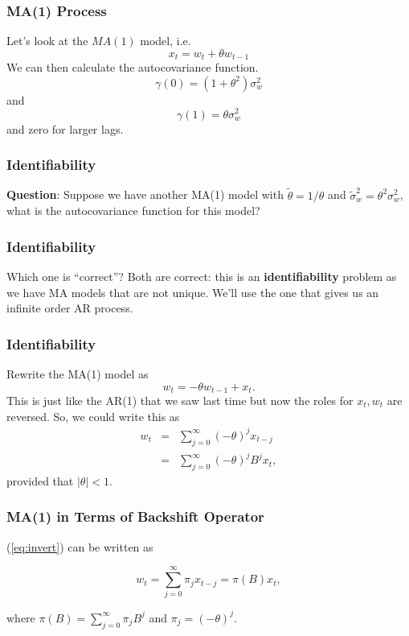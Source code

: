 \documentclass[%
xcolor=pdftex]{beamer}
\begin{document}
\begin{frame}
\frametitle{MA(1) Process}

Let's look at the $MA(1)$ model, i.e.
 $$
 x_t=w_t+ \theta w_{t-1}
 $$
 We can then calculate the autocovariance function.
 $$
 \gamma(0)=(1+\theta^2) \sigma_w^2
 $$
 and
 $$
 \gamma(1)=\theta \sigma_w^2
 $$
 and zero for larger lags.
 

\end{frame}

\begin{frame}
\frametitle{Identifiability}

\textbf{Question}: Suppose we have another MA(1) model with $\tilde{\theta}=1/\theta$ and $\tilde{\sigma}_w^2=\theta^2 \sigma^2_w$, what is the autocovariance function for this model?

\vspace{40mm}
\end{frame}

\begin{frame}
\frametitle{Identifiability}

 Which one is ``correct''?  Both are correct: this is an \textbf{identifiability} problem as we have MA models that are not unique. We'll use the one that gives us an infinite order AR process.

\end{frame}


\begin{frame}
\frametitle{Identifiability}

 Rewrite the MA(1) model as
 $$
 w_t=-\theta w_{t-1}+x_t.
 $$
 This is just like the AR(1) that we saw last time but now the roles for $x_t, w_t$ are reversed.  So, we could write this as
\begin{eqnarray} \label{eq:invert}
 w_t &=& \sum_{j=0}^\infty (-\theta)^j x_{t-j} \nonumber\\
     &=& \sum_{j=0}^\infty (-\theta)^j B^j x_{t},
\end{eqnarray}
 provided that $|\theta|<1$.

\end{frame}

 \begin{frame}
\frametitle{MA(1) in Terms of Backshift Operator}
(\ref{eq:invert}) can be written as

\begin{equation}
 w_t=\sum_{j=0}^\infty \pi_j x_{t-j} = \pi(B) x_{t},
\end{equation}

where $\pi(B) = \sum_{j=0}^\infty \pi_j B^j$ and $\pi_j = (-\theta)^j$.

\end{frame}
\end{document}
